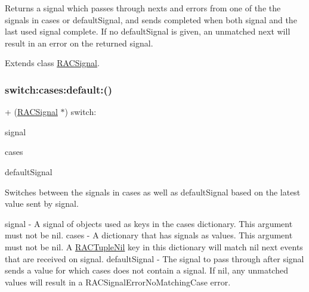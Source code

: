Returns a signal which passes through {\ttfamily next}s and {\ttfamily error}s from one of the the signals in {\ttfamily cases} or {\ttfamily default\+Signal}, and sends {\ttfamily completed} when both {\ttfamily signal} and the last used signal complete. If no {\ttfamily default\+Signal} is given, an unmatched {\ttfamily next} will result in an error on the returned signal. 

Extends class \mbox{\hyperlink{interface_r_a_c_signal_aac7816b22cfdcbe65cd43d99836ba1f5}{R\+A\+C\+Signal}}.

\mbox{\label{category_r_a_c_signal_07_operations_08_aac7816b22cfdcbe65cd43d99836ba1f5}} 
\subsubsection{\texorpdfstring{switch\+:cases\+:default\+:()}{switch:cases:default:()}\hspace{0.1cm}{\footnotesize\ttfamily [2/3]}}
{\footnotesize\ttfamily + (\mbox{\hyperlink{interface_r_a_c_signal}{R\+A\+C\+Signal}} $\ast$) switch\+: \begin{DoxyParamCaption}\item[{(\mbox{\hyperlink{interface_r_a_c_signal}{R\+A\+C\+Signal}} $\ast$)}]{signal }\item[{cases:(N\+S\+Dictionary $\ast$)}]{cases }\item[{default:(\mbox{\hyperlink{interface_r_a_c_signal}{R\+A\+C\+Signal}} $\ast$)}]{default\+Signal }\end{DoxyParamCaption}}

Switches between the signals in {\ttfamily cases} as well as {\ttfamily default\+Signal} based on the latest value sent by {\ttfamily signal}.

signal -\/ A signal of objects used as keys in the {\ttfamily cases} dictionary. This argument must not be nil. cases -\/ A dictionary that has signals as values. This argument must not be nil. A \mbox{\hyperlink{interface_r_a_c_tuple_nil}{R\+A\+C\+Tuple\+Nil}} key in this dictionary will match nil {\ttfamily next} events that are received on {\ttfamily signal}. default\+Signal -\/ The signal to pass through after {\ttfamily signal} sends a value for which {\ttfamily cases} does not contain a signal. If nil, any unmatched values will result in a R\+A\+C\+Signal\+Error\+No\+Matching\+Case error.

